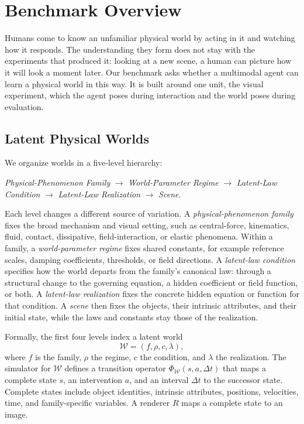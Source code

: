 \section{Benchmark Overview}
\label{sec:benchmark}

Humans come to know an unfamiliar physical world by acting in it and watching how it responds. The understanding they form does not stay with the experiments that produced it: looking at a new scene, a human can picture how it will look a moment later. Our benchmark asks whether a multimodal agent can learn a physical world in this way. It is built around one unit, the visual experiment, which the agent poses during interaction and the world poses during evaluation.

\subsection{Latent Physical Worlds}

We organize worlds in a five-level hierarchy:
\begin{center}
\textit{Physical-Phenomenon Family}
$\rightarrow$ \textit{World-Parameter Regime}
$\rightarrow$ \textit{Latent-Law Condition}
$\rightarrow$ \textit{Latent-Law Realization}
$\rightarrow$ \textit{Scene}.
\end{center}
Each level changes a different source of variation. A \emph{physical-phenomenon family} fixes the broad mechanism and visual setting, such as central-force, kinematics, fluid, contact, dissipative, field-interaction, or elastic phenomena. Within a family, a \emph{world-parameter regime} fixes shared constants, for example reference scales, damping coefficients, thresholds, or field directions. A \emph{latent-law condition} specifies how the world departs from the family's canonical law: through a structural change to the governing equation, a hidden coefficient or field function, or both. A \emph{latent-law realization} fixes the concrete hidden equation or function for that condition. A \emph{scene} then fixes the objects, their intrinsic attributes, and their initial state, while the laws and constants stay those of the realization.

Formally, the first four levels index a latent world
\begin{equation}
  \mathcal{W} = (f, \rho, c, \lambda),
  \label{eq:latent-world}
\end{equation}
where $f$ is the family, $\rho$ the regime, $c$ the condition, and $\lambda$ the realization. The simulator for $\mathcal{W}$ defines a transition operator $\Phi_{\mathcal{W}}(s,a,\Delta t)$ that maps a complete state $s$, an intervention $a$, and an interval $\Delta t$ to the successor state. Complete states include object identities, intrinsic attributes, positions, velocities, time, and family-specific variables. A renderer $R$ maps a complete state to an image.

